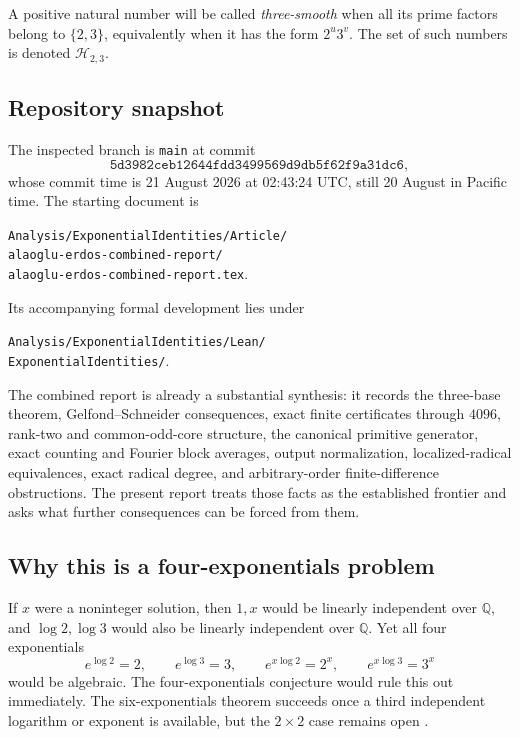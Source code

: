 \documentclass[11pt,oneside]{article}
\theoremstyle{definition}
\newcommand{\Q}{\mathbb Q}
\newcommand{\Smooth}{\mathcal H_{2,3}}
\newcommand{\commit}[1]{\texttt{#1}}
\begin{document}
A positive natural number will be called \emph{three-smooth} when all its prime factors
belong to \(\{2,3\}\), equivalently when it has the form \(2^u3^v\).  The set of such
numbers is denoted \(\Smooth\).

\subsection{Repository snapshot}

The inspected branch is \texttt{main} at commit
\[
  \commit{5d3982ceb12644fdd3499569d9db5f62f9a31dc6},
\]
whose commit time is 21 August 2026 at 02:43:24 UTC, still 20 August in Pacific time.  The
starting document is
\begin{center}
\small
\texttt{Analysis/ExponentialIdentities/Article/}\\
\texttt{alaoglu-erdos-combined-report/}\\
\texttt{alaoglu-erdos-combined-report.tex}.
\end{center}
Its accompanying formal development lies under
\begin{center}
\small
\texttt{Analysis/ExponentialIdentities/Lean/}\\
\texttt{ExponentialIdentities/}.
\end{center}

The combined report is already a substantial synthesis: it records the three-base theorem,
Gelfond--Schneider consequences, exact finite certificates through \(4096\), rank-two and
common-odd-core structure, the canonical primitive generator, exact counting and Fourier
block averages, output normalization, localized-radical equivalences, exact radical degree,
and arbitrary-order finite-difference obstructions.  The present report treats those facts
as the established frontier and asks what further consequences can be forced from them.

\subsection{Why this is a four-exponentials problem}

If \(x\) were a noninteger solution, then \(1,x\) would be linearly independent over
\(\Q\), and \(\log2,\log3\) would also be linearly independent over \(\Q\).  Yet all
four exponentials
\[
  e^{\log2}=2,\qquad e^{\log3}=3,\qquad
  e^{x\log2}=2^x,\qquad e^{x\log3}=3^x
\]
would be algebraic.  The four-exponentials conjecture would rule this out immediately.
The six-exponentials theorem succeeds once a third independent logarithm or exponent is
available, but the \(2\times2\) case remains open
\cite{Ramachandra1968II,Roy1992,Waldschmidt2000,TheoremDB2026}.
\end{document}
